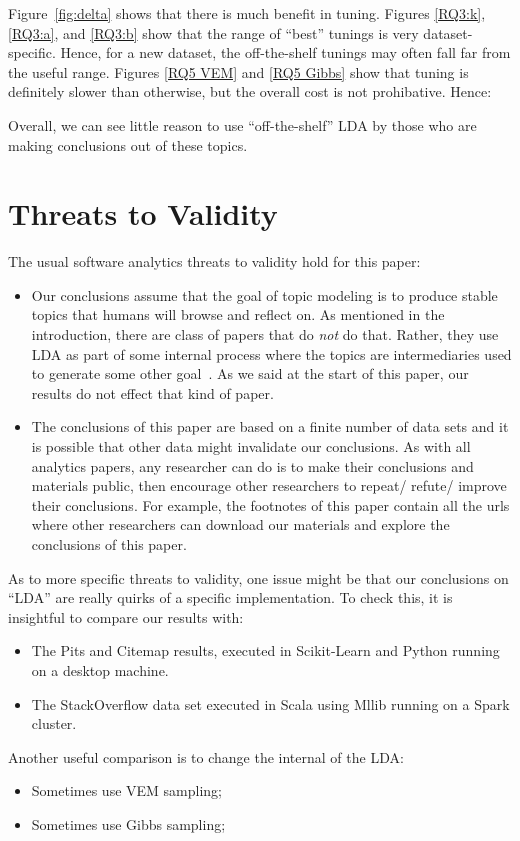 \documentclass[10pt,conference]{IEEEtran}
\newcommand{\bi}{\begin{itemize}}
\newcommand{\ei}{\end{itemize}}
\theoremstyle{break}
\begin{document}
  Figure~\ref{fig:delta} shows that there is much benefit in tuning.
  Figures \ref{RQ3:k}, \ref{RQ3:a}, and \ref{RQ3:b} show that
  the range of ``best'' tunings is very dataset-specific. Hence, for a new dataset,
  the off-the-shelf tunings
  may often fall far from the useful range.
  Figures \ref{RQ5 VEM} and \ref{RQ5 Gibbs} show that tuning is definitely
  slower than otherwise, but the overall cost is not prohibative.
  Hence:
  \begin{lesson}
    Overall, we can see little reason  to use ``off-the-shelf'' LDA by those who are making conclusions out of these topics.
    \end{lesson}

 
 

\section{Threats to Validity}
\label{sect: validity}
The usual software analytics threats to validity hold for this paper:
\bi
\item
  Our conclusions assume that the goal of topic modeling is to produce stable topics
  that humans will browse and reflect on. As mentioned in the introduction, there are
  class of papers that do {\em not} do that. Rather, they use LDA as part of some internal
  process where the topics are intermediaries
  used to generate some other goal~\cite{chen2016topic}. As we said at the start
    of this paper, our results do not effect that kind of paper.
\item
The conclusions of this paper are based on a finite number of data sets and it is possible
that other data might invalidate our conclusions. As with all analytics papers, any researcher can do is to make their conclusions and materials public, then encourage
other researchers to repeat/ refute/ improve their conclusions. For example, the footnotes of this paper contain all the urls where other researchers can download
our materials and explore the conclusions of this paper.
\ei

As to more specific threats to validity, one issue might be that our conclusions
on ``LDA'' are really quirks of a specific implementation.
To check this, it is insightful to compare our results with:
\bi
\item The Pits and Citemap results, executed in Scikit-Learn and Python running on
  a desktop machine.
\item The StackOverflow data set executed in Scala using Mllib running on a Spark cluster.
  \ei
  Another useful comparison is to change the internal of the LDA:
  \bi
\item Sometimes use VEM sampling;
\item Sometimes use Gibbs sampling;
  \ei
\end{document}
